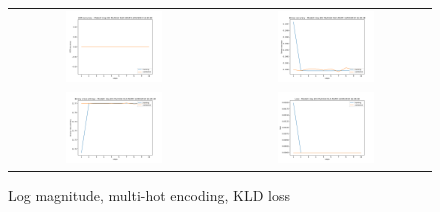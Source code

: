 \begin{appendices}
         \begin{figure}[H]
            \centering
            \begin{tabular}{cc}
                \includegraphics[width=0.48\textwidth]{figures/training_plots/ModelC-(log_2D)-MultiHot-KLD-ADAM_13-04-2019_16-30-38_AON-accuracy.pdf} & \includegraphics[width=0.48\textwidth]{figures/training_plots/ModelC-(log_2D)-MultiHot-KLD-ADAM_13-04-2019_16-30-38_binary-accuracy.pdf} \\
                \includegraphics[width=0.48\textwidth]{figures/training_plots/ModelC-(log_2D)-MultiHot-KLD-ADAM_13-04-2019_16-30-38_binary-cross-entropy.pdf} & \includegraphics[width=0.48\textwidth]{figures/training_plots/ModelC-(log_2D)-MultiHot-KLD-ADAM_13-04-2019_16-30-38_loss.pdf}
            \end{tabular}
            \caption*{Log magnitude, multi-hot encoding, KLD loss}
        \end{figure}
        

\end{appendices}
